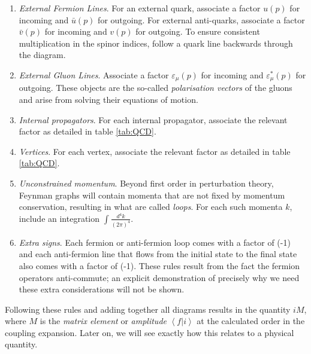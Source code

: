 \begin{enumerate}
\item{\emph{External Fermion Lines}. For an external quark, associate a factor $u(p)$ for incoming and $\bar{u}(p)$ for outgoing. For external anti-quarks, associate a factor $\bar{v}(p)$ for incoming and $v(p)$ for outgoing. To ensure consistent multiplication in the spinor indices, follow a quark line backwards through the diagram.}
\item{\emph{External Gluon Lines}.  Associate a factor $\varepsilon_\mu(p)$ for incoming and $\varepsilon^*_\mu(p)$ for outgoing. These objects are the so-called \emph{polarisation vectors} of the gluons and arise from solving their equations of motion.}
\item{\emph{Internal propagators}. For each internal propagator, associate the relevant factor as detailed in table \ref{tab:QCD}.}
\item{\emph{Vertices}. For each vertex, associate the relevant factor as detailed in table \ref{tab:QCD}.}
\item{\emph{Unconstrained momentum}. Beyond first order in perturbation theory, Feynman graphs will contain momenta that are not fixed by momentum conservation, resulting in what are called \emph{loops}. For each such momenta $k$, include an integration $\int \frac{d^4 k}{(2 \pi)^4}$. }
\item{\emph{Extra signs}. Each fermion or anti-fermion loop comes with a factor of (-1) and each anti-fermion line that flows from the initial state to the final state also comes with a factor of (-1). These rules result from the fact the fermion operators anti-commute; an explicit demonstration of precisely why we need these extra considerations will not be shown.}
\end{enumerate}

Following these rules and adding together all diagrams results in the quantity $i M$, where $M$ is the \emph{matrix element} or \emph{amplitude} $\left<f | i \right>$ at the calculated order in the coupling expansion. Later on, we will see exactly how this relates to a physical quantity. 

